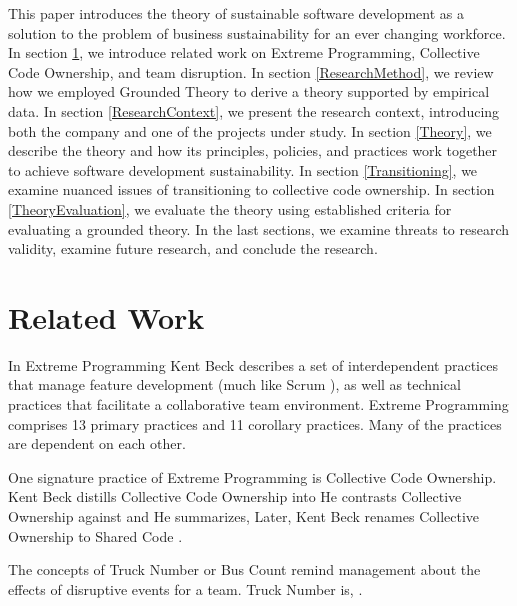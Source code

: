 This paper introduces the theory of sustainable software development as a solution to the problem of business sustainability for an ever changing workforce. In section \ref{RelatedWork}, we introduce related work on Extreme Programming, Collective Code Ownership, and team disruption. In section \ref{ResearchMethod}, we review how we employed Grounded Theory to derive a theory supported by empirical data. In section \ref{ResearchContext}, we present the research context, introducing both the company and one of the projects under study. In section \ref{Theory}, we describe the theory and how its principles, policies, and practices work together to achieve software development sustainability. In section \ref{Transitioning}, we examine nuanced issues of transitioning to collective code ownership. In section \ref{TheoryEvaluation}, we evaluate the theory using established criteria for evaluating a grounded theory. In the last sections, we examine threats to research validity, examine future research, and conclude the research.
\section{Related Work}
\label{RelatedWork}
In Extreme Programming \cite{ExtremeProgramming2004} Kent Beck describes a set of interdependent practices that manage feature development (much like Scrum \cite{Scrum}), as well as technical practices that facilitate a collaborative team environment.  Extreme Programming comprises 13 primary practices and 11 corollary practices. Many of the practices are dependent on each other.  

One signature practice of Extreme Programming is Collective Code Ownership. Kent Beck distills Collective Code Ownership into  He contrasts Collective Ownership against  and  He summarizes,   \cite{ExtremeProgramming2000} Later, Kent Beck renames Collective Ownership to Shared Code \cite{ExtremeProgramming2004}. 

The concepts of Truck Number or Bus Count remind management about the effects of disruptive events for a team. Truck Number is,  \cite{WikiTruckNumber}. 

